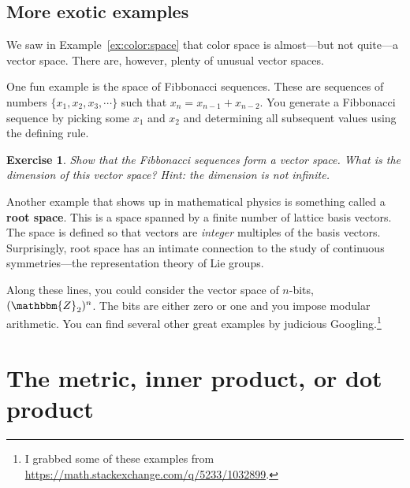 \documentclass[
  11pt,
	colorful,
	raggedright,
]{tufte-style-thesis-flip}
\newtheorem{exercise}{Exercise}[section]
\begin{document}
\subsection{More exotic examples}
 
We saw in Example~\ref{ex:color:space} that color space is almost---but not quite---a vector space. There are, however, plenty of unusual vector spaces. 

One fun example is the space of Fibbonacci sequences. These are sequences of numbers $\{x_1, x_2, x_3, \cdots \}$ such that $x_n = x_{n-1} + x_{n-2}$. You generate a Fibbonacci sequence by picking some $x_1$ and $x_2$ and determining all subsequent values using the defining rule. 
\begin{exercise}
Show that the Fibbonacci sequences form a vector space. What is the dimension of this vector space? Hint: the dimension is \emph{not infinite}.
\end{exercise}

Another example that shows up in mathematical physics is something called a \textbf{root space}. This is a space spanned by a finite number of lattice basis vectors. The space is defined so that vectors are \emph{integer} multiples of the basis vectors. Surprisingly, root space has an intimate connection to the study of continuous symmetries---the representation theory of Lie groups. 

Along these lines, you could consider the vector space of $n$-bits, $(\mathbbm{Z}_2)^n$. The bits are either zero or one and you impose modular arithmetic. 
%
You can find several other great examples by judicious Googling.\footnote{I grabbed some of these examples from \url{https://math.stackexchange.com/q/5233/1032899}.}



\section{The metric, inner product, or dot product}
\end{document}
